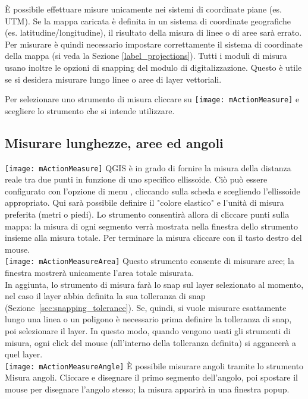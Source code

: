 È possibile effettuare misure unicamente nei sistemi di coordinate piane
(es. UTM). Se la mappa caricata è definita in un sistema di coordinate
geografiche (es. latitudine/longitudine), il risultato della misura di linee o
di aree sarà errato. Per misurare è quindi necessario impostare
correttamente il sistema di coordinate della mappa (si veda la Sezione \ref{label_projections}). 
Tutti i moduli di misura usano inoltre le opzioni di snapping del modulo di digitalizzazione. 
Questo è utile se si desidera misurare lungo linee o aree di layer vettoriali.

Per selezionare uno strumento di misura cliccare su \texttt{[image: mActionMeasure]} e scegliere lo strumento che si intende utilizzare.

\subsection{Misurare lunghezze, aree ed angoli}

\texttt{[image: mActionMeasure]} 
QGIS è in grado di fornire la misura della distanza reale tra due punti in
funzione di uno specifico ellissoide. Ciò può essere configurato con l'opzione di
menu  \arrow {}, 
cliccando sulla scheda  e scegliendo l'ellissoide
appropriato. Qui sarà possibile definire il "colore elastico" e l'unità di misura preferita 
(metri o piedi). Lo strumento consentirà allora di cliccare punti sulla mappa: la misura di ogni segmento 
verrà  mostrata nella finestra dello strumento insieme alla misura totale. Per terminare la misura cliccare con il
tasto destro del mouse. \\
\texttt{[image: mActionMeasureArea]} Questo strumento consente di
misurare aree; la finestra mostrerà unicamente l'area totale misurata. \\
In aggiunta, lo strumento di misura farà lo snap sul layer selezionato al momento, nel caso il layer abbia definita 
la sua tolleranza di snap (Sezione~\ref{sec:snapping_tolerance}). 
Se, quindi, si vuole misurare esattamente lungo una linea o un poligono è necessario prima definire la tolleranza di snap, poi selezionare il layer. In questo modo, quando vengono usati gli strumenti di misura, ogni click del mouse (all'interno della tolleranza definita) si aggancerà a quel layer. \\
\texttt{[image: mActionMeasureAngle]}
È possibile misurare angoli tramite lo strumento Misura angoli. Cliccare e disegnare il primo segmento dell'angolo, poi spostare il mouse per disegnare l'angolo stesso; la misura apparirà in una finestra popup.

